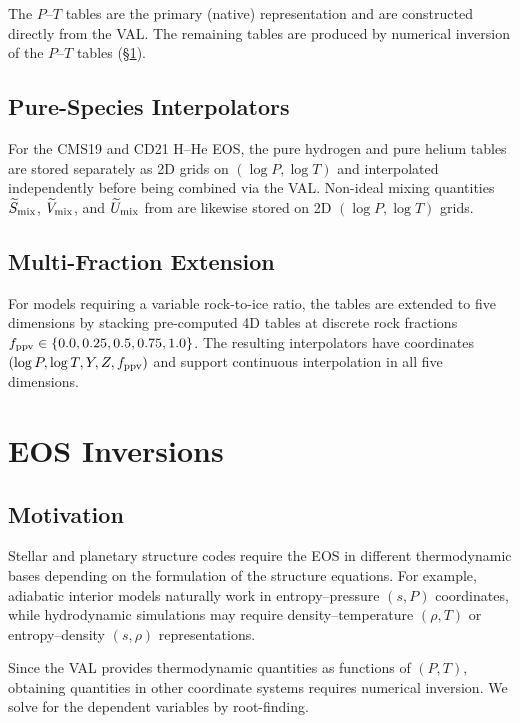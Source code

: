 \documentclass[twocolumn]{aastex701}
\begin{document}
The $P$--$T$ tables are the primary (native) representation and are constructed directly from the VAL.
The remaining tables are produced by numerical inversion of the $P$--$T$ tables (\S\ref{sec:inversion}).

\subsection{Pure-Species Interpolators}

For the CMS19 and CD21 H--He EOS, the pure hydrogen and pure helium tables are stored separately as 2D grids on $(\log P, \log T)$ and interpolated independently before being combined via the VAL.
Non-ideal mixing quantities $\widetilde{S}_{\rm mix}$, $\widetilde{V}_{\rm mix}$, and $\widetilde{U}_{\rm mix}$ from \citet{Howard2023a} are likewise stored on 2D $(\log P, \log T)$ grids.

\subsection{Multi-Fraction Extension}

For models requiring a variable rock-to-ice ratio, the tables are extended to five dimensions by stacking pre-computed 4D tables at discrete rock fractions $f_{\rm ppv} \in \{0.0, 0.25, 0.5, 0.75, 1.0\}$.
The resulting interpolators have coordinates $(\log P, \log T, Y, Z, f_{\rm ppv})$ and support continuous interpolation in all five dimensions.

\section{EOS Inversions}\label{sec:inversion}

\subsection{Motivation}

Stellar and planetary structure codes require the EOS in different thermodynamic bases depending on the formulation of the structure equations.
For example, adiabatic interior models naturally work in entropy--pressure $(s,P)$ coordinates, while hydrodynamic simulations may require density--temperature $(\rho,T)$ or entropy--density $(s,\rho)$ representations.

Since the VAL provides thermodynamic quantities as functions of $(P,T)$, obtaining quantities in other coordinate systems requires numerical inversion.
We solve for the dependent variables by root-finding.
\end{document}
